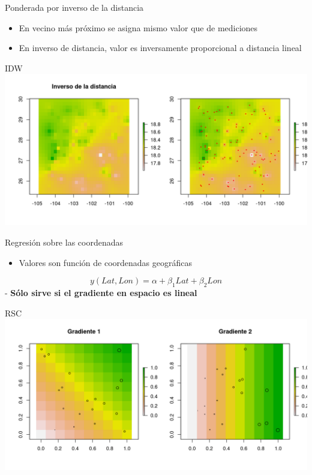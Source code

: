 \documentclass[
  11pt,
  ignorenonframetext,
]{beamer}
\providecommand{\tightlist}{%
  \setlength{\itemsep}{0pt}\setlength{\parskip}{0pt}}
\begin{document}
\begin{frame}{Ponderada por inverso de la distancia}
\protect\hypertarget{ponderada-por-inverso-de-la-distancia}{}
\begin{itemize}
\item
  En vecino más próximo se asigna mismo valor que de mediciones
\item
  En inverso de distancia, valor es inversamente proporcional a
  distancia lineal
\end{itemize}
\end{frame}

\begin{frame}{IDW}
\protect\hypertarget{idw}{}
\includegraphics{Interpolacion/Idw-1.png}
\end{frame}

\begin{frame}{Regresión sobre las coordenadas}
\protect\hypertarget{regresiuxf3n-sobre-las-coordenadas}{}
\begin{itemize}
\tightlist
\item
  Valores son función de coordenadas geográficas
\end{itemize}

\[y(Lat, Lon) = \alpha + \beta_1 Lat + \beta_2 Lon\] - \textbf{Sólo
sirve si el gradiente en espacio es lineal}
\end{frame}

\begin{frame}{RSC}
\protect\hypertarget{rsc}{}
\includegraphics{Interpolacion/Gradientes-1.png}
\end{frame}
\end{document}
